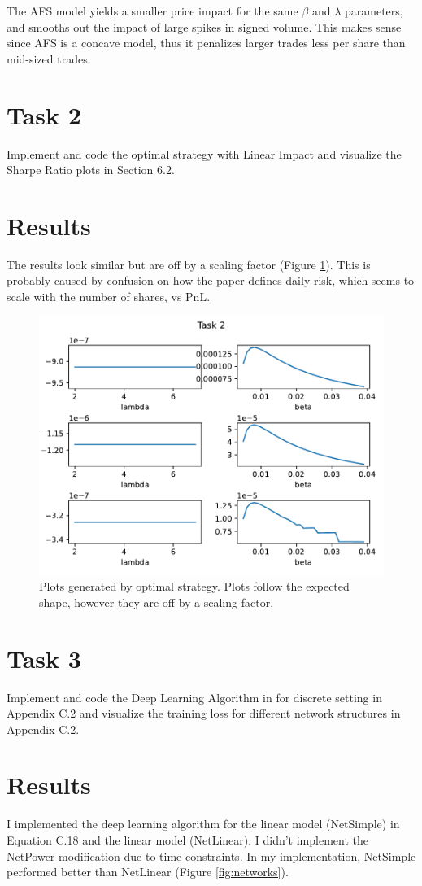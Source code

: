 \documentclass{article}
\begin{document}
	The AFS model yields a smaller price impact for the same $\beta$ and $\lambda$ parameters, and smooths out the impact of large spikes in signed volume. This makes sense since AFS is a concave model, thus it penalizes larger trades less per share than mid-sized trades.
	
	\section{Task 2}
	Implement and code the optimal strategy with Linear Impact and visualize the Sharpe Ratio
	plots in Section 6.2.
	\vspace{-1em}
	\section*{Results}
	The results look similar but are off by a scaling factor (Figure \ref{fig:task2}). This is probably caused by confusion on how the paper defines daily risk, which seems to scale with the number of shares, vs PnL.
	
	\begin{figure}[h]
		\centering
		\includegraphics[width=0.6\linewidth]{figures/task2.pdf}
		\caption{Plots generated by optimal strategy. Plots follow the expected shape, however they are off by a scaling factor.}
		\label{fig:task2}
	\end{figure}
	
	\section{Task 3}
	Implement and code the Deep Learning Algorithm in for discrete setting in Appendix C.2 and visualize the training loss for different network structures in Appendix C.2.
	\vspace{-1em}
	\section*{Results}
	I implemented the deep learning algorithm for the linear model (NetSimple) in Equation C.18 and the linear model (NetLinear). I didn't implement the NetPower modification due to time constraints. In my implementation, NetSimple performed better than NetLinear (Figure \ref{fig:networks}).
	
\end{document}
